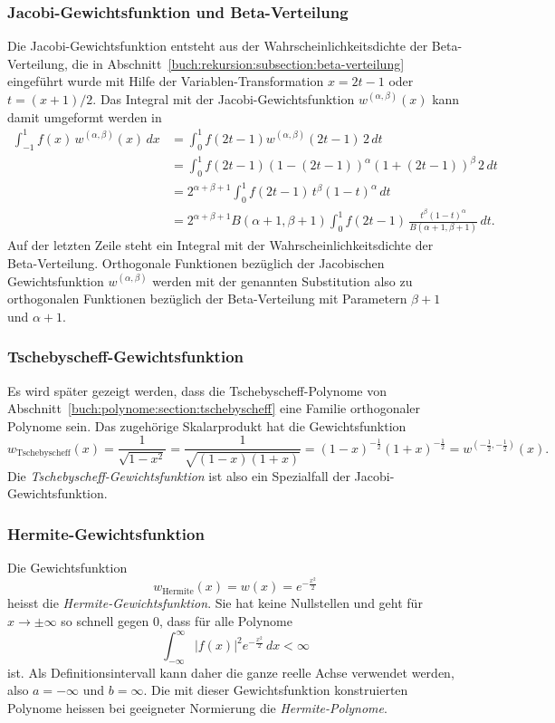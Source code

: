 \subsubsection{Jacobi-Gewichtsfunktion und Beta-Verteilung
\label{buch:orthogonal:subsection:beta-verteilung}}
Die Jacobi-Gewichtsfunktion entsteht aus der Wahrscheinlichkeitsdichte
der Beta-Verteilung, die in
Abschnitt~\ref{buch:rekursion:subsection:beta-verteilung}
eingeführt wurde mit Hilfe der Variablen-Transformation $x = 2t-1$
oder $t=(x+1)/2$.
Das Integral mit der Jacobi-Gewichtsfunktion $w^{(\alpha,\beta)}(x)$
kann damit umgeformt werden in
\begin{align*}
\int_{-1}^1
f(x)\,w^{(\alpha,\beta)}(x)\,dx
&=
\int_0^1
f(2t-1) w^{(\alpha,\beta)}(2t-1)\,2\,dt
\\
&=
\int_0^1
f(2t-1)
(1-(2t-1))^\alpha (1+(2t-1))^\beta
\,2\,dt
\\
&=
2^{\alpha+\beta+1}
\int_0^1
f(2t-1)
\,
t^\beta
(1-t)^\alpha
\,dt
\\
&=
2^{\alpha+\beta+1}
B(\alpha+1,\beta+1)
\int_0^1
f(2t-1)
\,
\frac{
t^\beta
(1-t)^\alpha
}{B(\alpha+1,\beta+1)}
\,dt.
\end{align*}
Auf der letzten Zeile steht ein Integral mit der Wahrscheinlichkeitsdichte
der Beta-Verteilung.
Orthogonale Funktionen bezüglich der Jacobischen Gewichtsfunktion
$w^{(\alpha,\beta)}$ werden mit der genannten Substitution also
zu orthogonalen Funktionen bezüglich der Beta-Verteilung mit
Parametern $\beta+1$ und $\alpha+1$.


%
%
\subsubsection{Tschebyscheff-Gewichtsfunktion}
Es wird später gezeigt werden, dass die Tschebyscheff-Polynome
von Abschnitt~\ref{buch:polynome:section:tschebyscheff} eine
Familie orthogonaler Polynome sein.
Das zugehörige Skalarprodukt hat die Gewichtsfunktion
\[
w_{\text{Tschebyscheff}}(x)
=
\frac{1}{\sqrt{1-x^2}}
=
\frac{1}{\sqrt{(1-x)(1+x)}}
=
(1-x)^{-\frac{1}{2}}
(1+x)^{-\frac{1}{2}}
=
w^{(-\frac12,-\frac12)}(x).
\]
Die {\em Tschebyscheff-Gewichtsfunktion} ist also ein Spezialfall der
Jacobi-Gewichtsfunktion.
%

%
%
\subsubsection{Hermite-Gewichtsfunktion}
Die Gewichtsfunktion
\[
w_{\text{Hermite}}(x)
=
w(x)
=
e^{-\frac{x^2}{2}}
\]
heisst die {\em Hermite-Gewichtsfunktion}.
%
Sie hat keine Nullstellen und geht für $x\to\pm\infty$ so schnell
gegen $0$, dass für alle Polynome 
\[
\int_{-\infty}^\infty |f(x)|^2 e^{-\frac{x^2}{2}}\,dx<\infty
\]
ist.
Als Definitionsintervall kann daher die ganze reelle Achse
verwendet werden, also $a=-\infty$ und $b=\infty$.
Die mit dieser Gewichtsfunktion konstruierten Polynome heissen
bei geeigneter Normierung die {\em Hermite-Polynome}.
%

